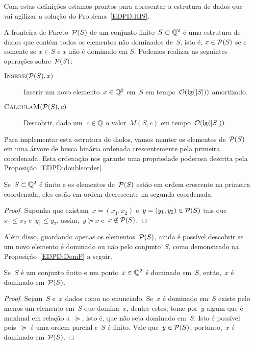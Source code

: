 Com estas definições estamos prontos para apresentar a estrutura de dados que vai agilizar a solução do Problema~\ref{EDPD:HIS}.
\begin{defi} \label{EDPD:Pareto}
A fronteira de Pareto~$\mathcal{P}(S)$ de um conjunto finito~$S \subset \mathbb{Q}^2$ é uma estrutura de dados que contém todos os elementos não dominados de~$S$, isto é, $x \in \mathcal{P}(S)$ se e somente se $x \in S$ e $x$ não é dominado em $S$. Podemos realizar as seguintes operações sobre~$\mathcal{P}(S)$:

\begin{description}
\item[$\textsc{Insere}(\mathcal{P}(S),x)$] Inserir um novo elemento~$x \in \mathbb{Q}^2$ em~$S$ em tempo~$\mathcal{O}(\lg(|S|))$ amortizado.
\item[$\textsc{CalculaM}(\mathcal{P}(S),c)$] Descobrir, dado um~$c \in \mathbb{Q}$ o valor~$M(S,c)$ em tempo~$\mathcal{O}(\lg(|S|))$.
\end{description}
\end{defi}

Para implementar esta estrutura de dados, vamos manter os elementos de~$\mathcal{P}(S)$ em uma árvore de busca binária ordenada crescentemente pela primeira coordenada. Esta ordenação nos garante uma propriedade poderosa descrita pela Proposição~\ref{EDPD:doubleorder}.

\begin{prop} \label{EDPD:doubleorder}
Se~$S \subset \mathbb{Q}^2$ é finito e os elementos de~$\mathcal{P}(S)$ estão em ordem crescente na primeira coordenada, eles estão em ordem decrescente na segunda coordenada.
\end{prop}
\begin{proof}
Suponha que existam~$x = (x_1,x_2)$ e~$y = (y_1,y_2) \in \mathcal{P}(S)$ tais que~$x_1 \leq x_2$ e~$y_1 \leq y_2$, assim,~$y \succeq x$ e~$x \notin \mathcal{P}(S)$.
\end{proof}

Além disso, guardando apenas os elementos~$\mathcal{P}(S)$, ainda é possível descobrir se um novo elemento é dominado ou não pelo conjunto~$S$, como demonstrado na Proposição~\ref{EDPD:DomP} a seguir.

\begin{prop} \label{EDPD:DomP}
Se~$S$ é um conjunto finito e um ponto~$x \in \mathbb{Q}^2$ é dominado em~$S$, então,~$x$ é dominado em~$\mathcal{P}(S)$.
\end{prop}
\begin{proof}
Sejam~$S$ e~$x$ dados como no enunciado. Se~$x$ é dominado em~$S$ existe pelo menos um elemento em~$S$ que domina~$x$, dentre estes, tome por~$y$ algum que é maximal em relação a~$\succeq$, isto é, que não seja dominado em~$S$. Isto é possível pois~$\succeq$ é uma ordem parcial e~$S$ é finito. Vale que~${ y \in \mathcal{P}(S) }$, portanto,~$x$ é dominado em~$\mathcal{P}(S)$.
\end{proof}

